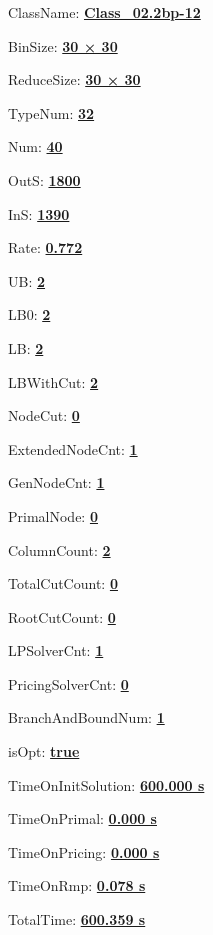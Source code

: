 \documentclass[11pt]{article}
\begin{document}
\pagestyle{empty}


ClassName: \underline{\textbf{Class_02.2bp-12}}
\par
BinSize: \underline{\textbf{30 × 30}}
\par
ReduceSize: \underline{\textbf{30 × 30}}
\par
TypeNum: \underline{\textbf{32}}
\par
Num: \underline{\textbf{40}}
\par
OutS: \underline{\textbf{1800}}
\par
InS: \underline{\textbf{1390}}
\par
Rate: \underline{\textbf{0.772}}
\par
UB: \underline{\textbf{2}}
\par
LB0: \underline{\textbf{2}}
\par
LB: \underline{\textbf{2}}
\par
LBWithCut: \underline{\textbf{2}}
\par
NodeCut: \underline{\textbf{0}}
\par
ExtendedNodeCnt: \underline{\textbf{1}}
\par
GenNodeCnt: \underline{\textbf{1}}
\par
PrimalNode: \underline{\textbf{0}}
\par
ColumnCount: \underline{\textbf{2}}
\par
TotalCutCount: \underline{\textbf{0}}
\par
RootCutCount: \underline{\textbf{0}}
\par
LPSolverCnt: \underline{\textbf{1}}
\par
PricingSolverCnt: \underline{\textbf{0}}
\par
BranchAndBoundNum: \underline{\textbf{1}}
\par
isOpt: \underline{\textbf{true}}
\par
TimeOnInitSolution: \underline{\textbf{600.000 s}}
\par
TimeOnPrimal: \underline{\textbf{0.000 s}}
\par
TimeOnPricing: \underline{\textbf{0.000 s}}
\par
TimeOnRmp: \underline{\textbf{0.078 s}}
\par
TotalTime: \underline{\textbf{600.359 s}}
\par
\newpage
\end{document}
